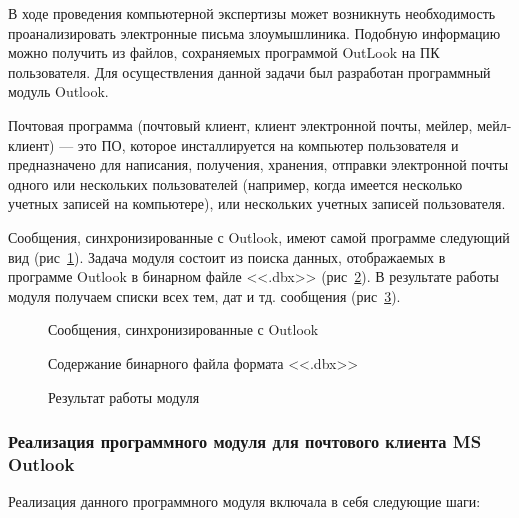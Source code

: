 В ходе проведения компьютерной экспертизы может возникнуть необходимость 
проанализировать электронные письма злоумышлиника. Подобную информацию можно 
получить из файлов, сохраняемых программой OutLook на ПК пользователя. Для 
осуществления данной задачи был разработан программный модуль Outlook.


Почтовая программа (почтовый клиент, клиент электронной почты, мейлер, мейл-клиент) --- 
это ПО, которое инсталлируется на компьютер пользователя и предназначено для 
написания, получения, хранения, отправки электронной почты одного или нескольких 
пользователей (например, когда имеется несколько учетных записей на компьютере), или 
нескольких учетных записей пользователя.


Сообщения, синхронизированные с Outlook, имеют самой программе следующий вид (рис~\ref{ser_1:ser_1}). Задача 
модуля состоит из поиска данных, отображаемых в программе Outlook в бинарном файле <<.dbx>> (рис~\ref{ser_2:ser_2}). В результате работы модуля получаем списки всех тем, дат и тд. сообщения (рис~\ref{ser_3:ser_3}).

\begin{figure}[h!]
\caption{Сообщения, синхронизированные с Outlook}
\label{ser_1:ser_1}
\end{figure} 

\begin{figure}[h!]
\caption{Содержание бинарного файла формата <<.dbx>>}
\label{ser_2:ser_2}
\end{figure} 

\begin{figure}[h!]
\caption{Результат работы модуля}
\label{ser_3:ser_3}
\end{figure} 


\clearpage
\subsubsection{Реализация программного модуля для почтового клиента MS Outlook}

Реализация данного программного модуля включала в себя следующие шаги:

